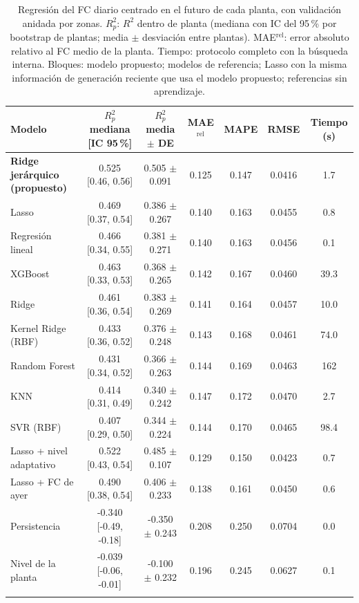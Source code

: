 \documentclass[pdflatex,sn-mathphys-num]{sn-jnl}
\begin{document}
\begin{table}[t]
\caption{Regresión del FC diario centrado en el futuro de cada planta, con validación anidada por zonas. $R^2_p$: $R^2$ dentro de planta (mediana con IC del 95\,\% por bootstrap de plantas; media $\pm$ desviación entre plantas). MAE$^{\text{rel}}$: error absoluto relativo al FC medio de la planta. Tiempo: protocolo completo con la búsqueda interna. Bloques: modelo propuesto; modelos de referencia; Lasso con la misma información de generación reciente que usa el modelo propuesto; referencias sin aprendizaje.}
\label{tab:reg}
\centering
\footnotesize
\begin{tabular}{@{}lcccccc@{}}
\toprule
Modelo & $R^2_p$ mediana [IC 95\,\%] & $R^2_p$ media $\pm$ DE & MAE$^{\text{rel}}$ & MAPE & RMSE & Tiempo (s)\\
\midrule
\textbf{Ridge jerárquico (propuesto)} & 0.525 [0.46, 0.56] & 0.505 $\pm$ 0.091 & 0.125 & 0.147 & 0.0416 & 1.7 \\
\midrule
Lasso & 0.469 [0.37, 0.54] & 0.386 $\pm$ 0.267 & 0.140 & 0.163 & 0.0455 & 0.8 \\
Regresión lineal & 0.466 [0.34, 0.55] & 0.381 $\pm$ 0.271 & 0.140 & 0.163 & 0.0456 & 0.1 \\
XGBoost & 0.463 [0.33, 0.53] & 0.368 $\pm$ 0.265 & 0.142 & 0.167 & 0.0460 & 39.3 \\
Ridge & 0.461 [0.36, 0.54] & 0.383 $\pm$ 0.269 & 0.141 & 0.164 & 0.0457 & 10.0 \\
Kernel Ridge (RBF) & 0.433 [0.36, 0.52] & 0.376 $\pm$ 0.248 & 0.143 & 0.168 & 0.0461 & 74.0 \\
Random Forest & 0.431 [0.34, 0.52] & 0.366 $\pm$ 0.263 & 0.144 & 0.169 & 0.0463 & 162 \\
KNN & 0.414 [0.31, 0.49] & 0.340 $\pm$ 0.242 & 0.147 & 0.172 & 0.0470 & 2.7 \\
SVR (RBF) & 0.407 [0.29, 0.50] & 0.344 $\pm$ 0.224 & 0.144 & 0.170 & 0.0465 & 98.4 \\
\midrule
Lasso + nivel adaptativo & 0.522 [0.43, 0.54] & 0.485 $\pm$ 0.107 & 0.129 & 0.150 & 0.0423 & 0.7 \\
Lasso + FC de ayer & 0.490 [0.38, 0.54] & 0.406 $\pm$ 0.233 & 0.138 & 0.161 & 0.0450 & 0.6 \\
\midrule
Persistencia & -0.340 [-0.49, -0.18] & -0.350 $\pm$ 0.243 & 0.208 & 0.250 & 0.0704 & 0.0 \\
Nivel de la planta & -0.039 [-0.06, -0.01] & -0.100 $\pm$ 0.232 & 0.196 & 0.245 & 0.0627 & 0.1 \\
\botrule
\end{tabular}
\end{table}
\end{document}
